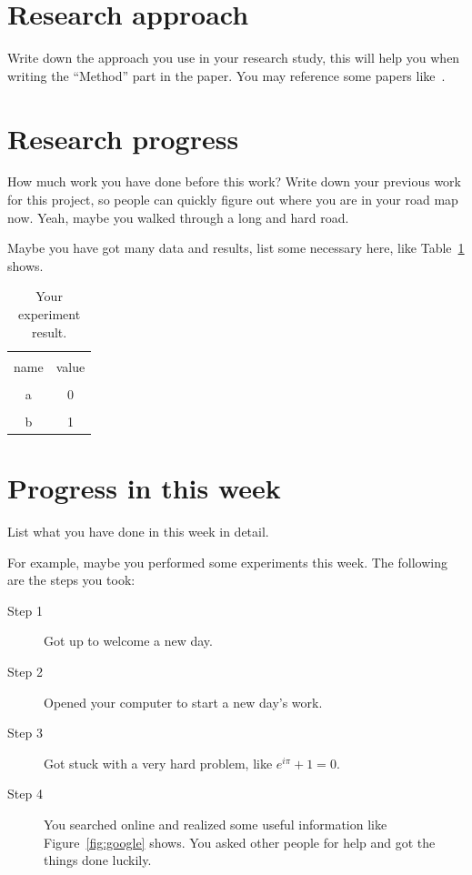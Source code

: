 \documentclass[a4paper]{article}
\begin{document}
\section{Research approach}

Write down the approach you use in your research study, this will help you when writing the ``Method'' part in the paper. You may reference some papers like~\cite{isola2017image}.


\section{Research progress}

How much work you have done before this work? Write down your previous work for this project, so people can quickly figure out where you are in your road map now. Yeah, maybe you walked through a long and hard road.

Maybe you have got many data and results, list some necessary here, like Table~\ref{tab:result} shows.

\begin{table}[hb]
    \centering
    \begin{tabular}{c|c}
        \hline \\
        name & value \\
        \hline \\
        a & 0 \\
        \hline \\
        b & 1 \\
        \hline
    \end{tabular}
    \caption{Your experiment result.}
    \label{tab:result}
\end{table}


\section{Progress in this week}

List what you have done in this week in detail.

For example, maybe you performed some experiments this week. The following are the steps you took:

\begin{description}
\item [Step 1]
Got up to welcome a new day.
\item[Step 2]
Opened your computer to start a new day's work.
\item[Step 3]
Got stuck with a very hard problem, like $e^{i \pi} + 1 = 0$.
\item[Step 4]
You searched online and realized some useful information like Figure~\ref{fig:google} shows. You asked other people for help and got the things done luckily.
\end{description}
\end{document}

